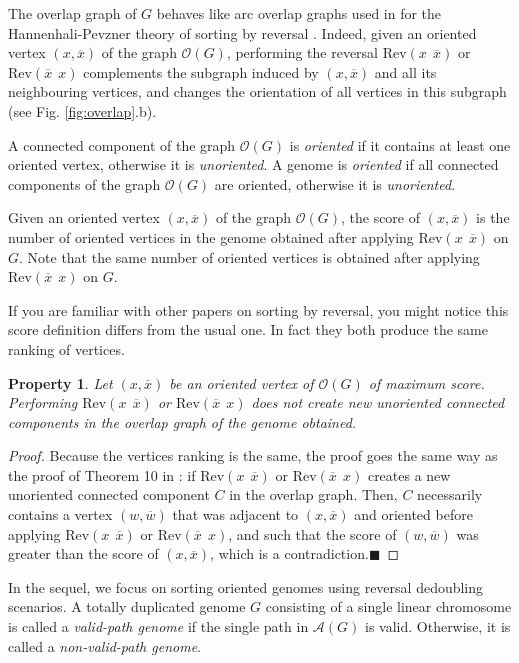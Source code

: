 \documentclass[11pt,final,twoside,nofrench]{thlifl}
\newcommand{\qed}{\ensuremath{\blacksquare}}
\newcommand{\snd}[1]{ \ensuremath{\overline{#1}} }
\newtheorem{property}{Property}
\newtheorem{proof}{Proof}
\begin{document}
The overlap graph of $G$ behaves like arc overlap graphs used in \cite{B-05}
for the Hannenhali-Pevzner theory of sorting by reversal \cite{HP-95}. Indeed, given an 
oriented vertex 
$(x,\snd{x})$ of the graph $\mathcal{O}(G)$, performing the reversal 
$\text{Rev}(x~~\snd{x})$ or $\text{Rev}(\snd{x}~~x)$ complements the subgraph induced by $(x,\snd{x})$ and all its neighbouring vertices, and changes the orientation of all vertices in this subgraph  (see Fig. \ref{fig:overlap}.b).

A connected component of the graph $\mathcal{O}(G)$ 
is \emph{oriented} if it contains at least one oriented vertex, 
otherwise it is \emph{unoriented}.
A genome is \emph{oriented} if all connected components of 
the graph $\mathcal{O}(G)$ are oriented, otherwise it is  \emph{unoriented}.

Given  an oriented vertex $(x,\snd{x})$ of the graph $\mathcal{O}(G)$,
the score of $(x,\snd{x})$ is the number of oriented vertices in
the genome obtained after applying $\text{Rev}(x~~\snd{x})$ on $G$. 
Note that the same number of oriented vertices is obtained after applying 
 $\text{Rev}(\snd{x}~~x)$ on $G$.

If you are familiar with other papers on sorting by reversal, you might notice this score definition differs from the usual one. In fact they both produce the same ranking of vertices.

\begin{property}
\label{prop:max-score}
Let $(x,\snd{x})$ be an oriented vertex of  $\mathcal{O}(G)$ of maximum score.
Performing $\text{Rev}(x~~\snd{x})$ or  $\text{Rev}(\snd{x}~~x)$ does not
create  new unoriented connected components in the overlap graph of the
genome obtained.
\end{property}
\begin{proof}
Because the vertices ranking is the same, the proof goes the same way as the proof of Theorem 10 in \cite{B-05}: if 
$\text{Rev}(x~~\snd{x})$ or  $\text{Rev}(\snd{x}~~x)$ creates a 
new unoriented connected component $C$ in the overlap graph. Then, 
$C$ necessarily 
contains a vertex $(w,\snd{w})$ that was adjacent to $(x,\snd{x})$ and
oriented before applying $\text{Rev}(x~~\snd{x})$ or  $\text{Rev}(\snd{x}~~x)$, 
and such that the score of $(w,\snd{w})$ was greater than the score of 
$(x,\snd{x})$, which is a contradiction.\qed
\end{proof}

In the sequel, we focus on sorting oriented genomes using reversal 
dedoubling scenarios. 
A totally duplicated genome $G$ consisting of a single linear chromosome 
is called a \emph{valid-path genome} if the single path in $\mathcal{A}(G)$ 
is valid. Otherwise, it is called a \emph{non-valid-path genome}.
\end{document}
